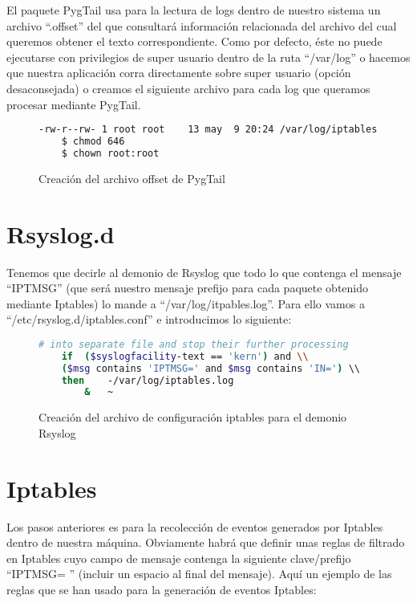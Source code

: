 El paquete PygTail usa para la lectura de logs dentro de nuestro sistema un archivo ``.offset'' del que consultará información relacionada del archivo del cual queremos obtener el texto correspondiente. Como por defecto, éste no puede ejecutarse con privilegios de super usuario dentro de la ruta ``/var/log'' o hacemos que nuestra aplicación corra directamente sobre super usuario (opción desaconsejada) o creamos el siguiente archivo para cada log que queramos procesar mediante PygTail.

\begin{figure}[H]
  \begin{lstlisting}[language=bash]
    -rw-r--rw- 1 root root    13 may  9 20:24 /var/log/iptables.log.offset
    $ chmod 646
    $ chown root:root
  \end{lstlisting}
  \caption{Creación del archivo offset de PygTail}
\end{figure}

\section{Rsyslog.d}

Tenemos que decirle al demonio de Rsyslog que todo lo que contenga el mensaje ``IPTMSG'' (que será nuestro mensaje prefijo para cada paquete obtenido mediante Iptables) lo mande a ``/var/log/itpables.log''. Para ello vamos a ``/etc/rsyslog.d/iptables.conf'' e introducimos lo siguiente:

\begin{figure}[H]
  \begin{lstlisting}[language=bash]
    # into separate file and stop their further processing
    if  ($syslogfacility-text == 'kern') and \\
    ($msg contains 'IPTMSG=' and $msg contains 'IN=') \\
    then    -/var/log/iptables.log
        &   ~
  \end{lstlisting}
  \caption{Creación del archivo de configuración iptables para el demonio Rsyslog}
\end{figure}

\section{Iptables}

Los pasos anteriores es para la recolección de eventos generados por Iptables dentro de nuestra máquina. Obviamente habrá que definir unas reglas de filtrado en Iptables cuyo campo de mensaje contenga la siguiente clave/prefijo ``IPTMSG= '' (incluir un espacio al final del mensaje). Aquí un ejemplo de las reglas que se han usado para la generación de eventos Iptables:

